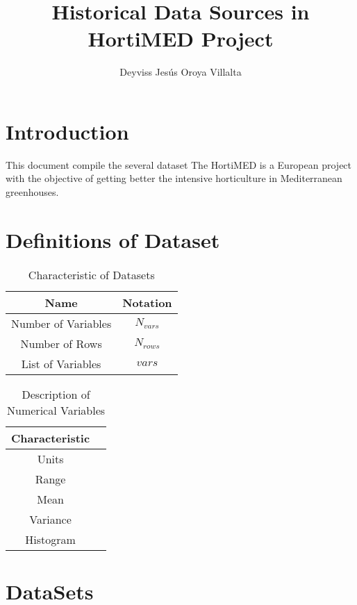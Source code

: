\documentclass{article}
\title{\textbf{Historical Data Sources in HortiMED Project}}
\author[1]{Deyviss Jesús Oroya Villalta}
\affil[1]{University of Deusto}
\begin{document}
    \maketitle
    \section{Introduction}
    This document compile the several dataset The HortiMED is a European project with the objective of getting better the intensive horticulture in Mediterranean greenhouses. 

    \section{Definitions of Dataset}

    \begin{table}[ht!]
        \centering
        \begin{tabular}{|c|c|}
            \hline 
            \textbf{Name}                & \textbf{Notation}      \\ \hline \hline 
            Number of Variables & $N_{vars}$    \\ \hline
            Number of Rows      & $N_{rows}$    \\ \hline 
            List of Variables   & $vars$        \\ \hline
        \end{tabular}
        \caption{Characteristic of Datasets}
    \end{table}
 
    \begin{table}[ht!]
        \centering
        \begin{tabular}{|c|c|}
            \hline 
            \textbf{Characteristic}\\ \hline  \hline 
            Units       \\  \hline 
            Range       \\ \hline 
            Mean        \\ \hline 
            Variance    \\  \hline 
            Histogram   \\ \hline
        \end{tabular}
        \caption{Description of Numerical Variables }
    \end{table}
    \section{DataSets}
\end{document}
